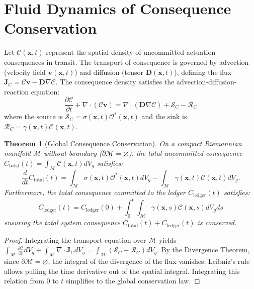 \documentclass[11pt,oneside]{book}
\theoremstyle{definition}
\theoremstyle{plain}
\newtheorem{theorem}{Theorem}[chapter]
\theoremstyle{remark}
\begin{document}
\section{Fluid Dynamics of Consequence Conservation}
Let $\mathcal{C}(\mathbf{x}, t)$ represent the spatial density of uncommitted actuation consequences in transit. %
The transport of consequence is governed by advection (velocity field $\mathbf{v}(\mathbf{x}, t)$) and diffusion (tensor $\mathbf{D}(\mathbf{x}, t)$), defining the flux $\mathbf{J}_C = \mathcal{C} \mathbf{v} - \mathbf{D} \nabla \mathcal{C}$. %
The consequence density satisfies the advection-diffusion-reaction equation:
\[
\frac{\partial \mathcal{C}}{\partial t} + \nabla \cdot (\mathcal{C} \mathbf{v}) = \nabla \cdot (\mathbf{D} \nabla \mathcal{C}) + \mathcal{S}_C - \mathcal{R}_C
\]
where the source is $\mathcal{S}_C = \sigma(\mathbf{x}, t) \mathcal{O}^*(\mathbf{x}, t)$ and the sink is $\mathcal{R}_C = \gamma(\mathbf{x}, t) \mathcal{C}(\mathbf{x}, t)$. %

\begin{theorem}[Global Consequence Conservation]\label{thm:global_cons}
On a compact Riemannian manifold $\mathcal{M}$ without boundary ($\partial \mathcal{M} = \varnothing$), the total uncommitted consequence $C_{\mathrm{total}}(t) = \int_{\mathcal{M}} \mathcal{C}(\mathbf{x}, t) dV_g$ satisfies:
\[
\frac{d}{dt} C_{\mathrm{total}}(t) = \int_{\mathcal{M}} \sigma(\mathbf{x}, t) \mathcal{O}^*(\mathbf{x}, t) dV_g - \int_{\mathcal{M}} \gamma(\mathbf{x}, t) \mathcal{C}(\mathbf{x}, t) dV_g.
\]
Furthermore, the total consequence committed to the ledger $C_{\mathrm{ledger}}(t)$ satisfies:
\[
C_{\mathrm{ledger}}(t) = C_{\mathrm{ledger}}(0) + \int_{0}^t \int_{\mathcal{M}} \gamma(\mathbf{x}, s) \mathcal{C}(\mathbf{x}, s) dV_g ds
\]
ensuring the total system consequence $C_{\mathrm{total}}(t) + C_{\mathrm{ledger}}(t)$ is conserved. %
\end{theorem}

\begin{proof}
Integrating the transport equation over $\mathcal{M}$ yields $\int_{\mathcal{M}} \frac{\partial \mathcal{C}}{\partial t} dV_g + \int_{\mathcal{M}} \nabla \cdot \mathbf{J}_C dV_g = \int_{\mathcal{M}} \left( \mathcal{S}_C - \mathcal{R}_C \right) dV_g$. %
By the Divergence Theorem, since $\partial \mathcal{M} = \varnothing$, the integral of the divergence of the flux vanishes. %
Leibniz's rule allows pulling the time derivative out of the spatial integral. %
Integrating this relation from $0$ to $t$ simplifies to the global conservation law. %
\end{proof}
\end{document}
